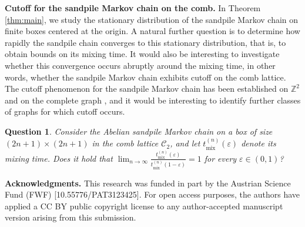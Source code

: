 \documentclass[11pt]{article}
\newtheorem{question}{Question}[section]
\begin{document}
\textbf{Cutoff for the sandpile Markov chain on the comb.} 
In Theorem \ref{thm:main}, we study the stationary distribution of the sandpile Markov chain on finite boxes centered at the origin. A natural further question is to determine how rapidly the sandpile chain converges to this stationary distribution, that is, to obtain bounds on its mixing time. It would also be interesting to investigate whether this convergence occurs abruptly around the mixing time, in other words, whether the sandpile Markov chain exhibits cutoff on the comb lattice. The cutoff phenomenon for the sandpile Markov chain has been established on $\mathbb{Z}^2$ \cite{HJL19} and on the complete graph \cite{JLP19}, and it would be interesting to identify further classes of graphs for which cutoff occurs.

\begin{question}
    Consider the Abelian sandpile Markov chain on a box of size $(2n+1)\times(2n+1)$ in the comb lattice $\mathcal{C}_2$, and let $t_{\mathrm{mix}}^{(n)}(\varepsilon)$ denote its mixing time. Does it hold that $\lim_{n\to\infty}\frac{t_{\mathrm{mix}}^{(n)}(\varepsilon)}{t_{\mathrm{mix}}^{(n)}(1-\varepsilon)}=1$ for every $\varepsilon\in(0,1)$?
\end{question}

\textbf{Acknowledgments.}
This research was funded in part by the Austrian Science Fund (FWF) [10.55776/\allowbreak{}PAT3123425]. For open access purposes, the authors have applied a CC BY public copyright license to any author-accepted manuscript version arising from this submission.
\end{document}
